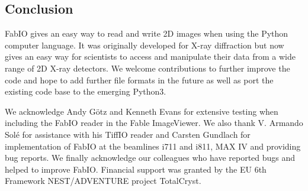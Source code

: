 \documentclass[preprint ]{iucr}
\begin{document}
%
%

\subsection{Conclusion}

FabIO gives an easy way to read and write 2D images when using the
Python computer language.
It was originally developed for X-ray diffraction but now gives
an easy way for scientists to access and manipulate
their data from a wide range of 2D X-ray detectors.
We welcome contributions to further improve the code and hope to add
further file formats in the future as well as port the existing code base 
to the emerging Python3.


We acknowledge Andy G\"otz and Kenneth Evans for extensive testing when including
the FabIO reader in the Fable ImageViewer.
We also thank V. Armando Sol\'e for assistance with his TiffIO reader and
Carsten Gundlach for implementation of FabIO at the beamlines i711 and i811, 
MAX IV and providing bug reports.
We finally acknowledge our colleagues who have reported bugs and helped to
improve FabIO.
Financial support was granted by the EU 6th Framework NEST/ADVENTURE project
TotalCryst.



%
%
\end{document}

